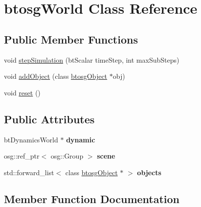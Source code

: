 \hypertarget{classbtosgWorld}{}\section{btosg\+World Class Reference}
\label{classbtosgWorld}
\subsection*{Public Member Functions}
\begin{DoxyCompactItemize}
\item 
void \hyperlink{classbtosgWorld_afce096686d8f84afd8b8fa3f2dc161b8}{step\+Simulation} (bt\+Scalar time\+Step, int max\+Sub\+Steps)
\item 
void \hyperlink{classbtosgWorld_ae5b71c6319dd420479096a265a1725b7}{add\+Object} (class \hyperlink{classbtosgObject}{btosg\+Object} $\ast$obj)
\item 
void \hyperlink{classbtosgWorld_a6af4d066410a86b44fff5563667ea9a9}{reset} ()
\end{DoxyCompactItemize}
\subsection*{Public Attributes}
\begin{DoxyCompactItemize}
\item 
\mbox{\label{classbtosgWorld_ad757a7b3b845142f200d1f2127e5372e}} 
bt\+Dynamics\+World $\ast$ {\bfseries dynamic}
\item 
\mbox{\label{classbtosgWorld_ab6d438f54ccfc18955ea43e87731e008}} 
osg\+::ref\+\_\+ptr$<$ osg\+::\+Group $>$ {\bfseries scene}
\item 
\mbox{\label{classbtosgWorld_ab105aa8c0f8bdbdf323d47b902f6aca0}} 
std\+::forward\+\_\+list$<$ class \hyperlink{classbtosgObject}{btosg\+Object} $\ast$ $>$ {\bfseries objects}
\end{DoxyCompactItemize}


\subsection{Member Function Documentation}
\mbox{\label{classbtosgWorld_ae5b71c6319dd420479096a265a1725b7}} 
